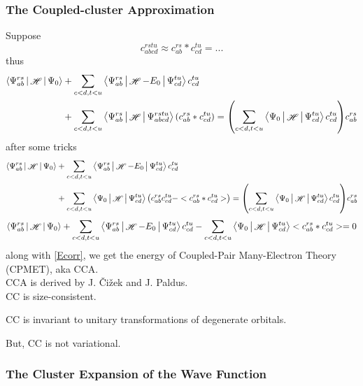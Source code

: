 \documentclass[a4paper]{article}
\DeclareMathOperator{\sH}{\mathscr{H}}
\numberwithin{equation}{section}
\begin{document}
\subsubsection{The Coupled-cluster Approximation}
Suppose
\begin{equation}\label{key}
c_{abcd}^{rstu} \approx c_{ab}^{rs} * c_{cd}^{tu} = ...
\end{equation}
thus
\begin{equation}\label{key}
\begin{aligned}
\Braket{\Psi_{ab}^{rs} | \sH | \Psi_0} &+ \sum_{c<d, t<u} \Braket{\Psi_{ab}^{rs} | \sH - E_0 | \Psi_{cd}^{tu}} c_{cd}^{tu} \\
&+ \sum_{c<d, t<u} \Braket{\Psi_{ab}^{rs} | \sH | \Psi_{abcd}^{rstu}} (c_{ab}^{rs} * c_{cd}^{tu}) = \qty(\sum_{c<d, t<u} \Braket{\Psi_0 | \sH | \Psi_{cd}^{tu}} c_{cd}^{tu}) c_{ab}^{rs} 
\end{aligned}
\end{equation}
after some tricks
\begin{equation}\label{key}
\begin{aligned}
\Braket{\Psi_{ab}^{rs} | \sH | \Psi_0} &+ \sum_{c<d, t<u} \Braket{\Psi_{ab}^{rs} | \sH - E_0 | \Psi_{cd}^{tu}} c_{cd}^{tu} \\
&+ \sum_{c<d, t<u} \Braket{\Psi_0 | \sH | \Psi_{cd}^{tu}} \qty(c_{ab}^{rs} c_{cd}^{tu} - < c_{ab}^{rs} * c_{cd}^{tu} > ) = \qty(\sum_{c<d, t<u} \Braket{\Psi_0 | \sH | \Psi_{cd}^{tu}} c_{cd}^{tu}) c_{ab}^{rs} 
\end{aligned}
\end{equation}
\begin{equation}\label{key}
\Braket{\Psi_{ab}^{rs} | \sH | \Psi_0} + \sum_{c<d, t<u} \Braket{\Psi_{ab}^{rs} | \sH - E_0 | \Psi_{cd}^{tu}} c_{cd}^{tu} 
- \sum_{c<d, t<u} \Braket{\Psi_0 | \sH | \Psi_{cd}^{tu}} < c_{ab}^{rs} * c_{cd}^{tu} > = 0
\end{equation}
along with \eqref{Ecorr}, we get the energy of Coupled-Pair Many-Electron Theory (CPMET), aka CCA.\\
CCA is derived by J. \v{C}i\v{z}ek and J. Paldus.\\

CC is size-consistent.

CC is invariant to unitary transformations of degenerate orbitals.

But, CC is not variational.


\subsubsection{The Cluster Expansion of the Wave Function}
\end{document}
